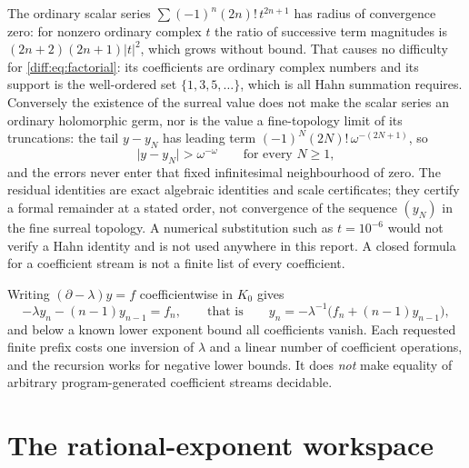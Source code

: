 \documentclass[11pt,letterpaper]{article}
\numberwithin{equation}{section}
\theoremstyle{definition}
\theoremstyle{remark}
\newcommand{\der}{\partial}
\newcommand{\abs}[1]{\lvert#1\rvert}
\begin{document}
\begin{warning}
\label{diff:warn:antitopological}
The ordinary scalar series $\sum(-1)^{n}(2n)!\,t^{2n+1}$ has radius of
convergence zero: for nonzero ordinary complex $t$ the ratio of successive
term magnitudes is $(2n+2)(2n+1)\abs t^{2}$, which grows without bound. That
causes no difficulty for \cref{diff:eq:factorial}: its coefficients are
ordinary complex numbers and its support is the well-ordered set
$\{1,3,5,\dots\}$, which is all Hahn summation requires. Conversely the
existence of the surreal value does not make the scalar series an ordinary
holomorphic germ, nor is the value a fine-topology limit of its truncations:
the tail $y-y_{N}$ has leading term
$(-1)^{N}(2N)!\,\omega^{-(2N+1)}$, so
\[
 \abs{y-y_{N}}>\omega^{-\omega}\qquad\text{for every }N\geq1 ,
\]
and the errors never enter that fixed infinitesimal neighbourhood of zero. The
residual identities are exact algebraic identities and scale certificates;
they certify a formal remainder at a stated order, not convergence of the
sequence $(y_{N})$ in the fine surreal topology. A numerical substitution such as
$t=10^{-6}$ would not verify a Hahn identity and is not used anywhere in this
report. A closed formula for a coefficient stream is not a finite list of every
coefficient.
\end{warning}

\begin{remark}
\label{diff:rem:coefrecursion}
Writing $(\der-\lambda)y=f$ coefficientwise in $K_{0}$ gives
\begin{equation}\label{diff:eq:coefrecursion}
 -\lambda y_{n}-(n-1)y_{n-1}=f_{n},
 \qquad\text{that is}\qquad
 y_{n}=-\lambda^{-1}\bigl(f_{n}+(n-1)y_{n-1}\bigr),
\end{equation}
and below a known lower exponent bound all coefficients vanish. Each requested
finite prefix costs one inversion of $\lambda$ and a linear number of
coefficient operations, and the recursion works for negative lower bounds. It
does \emph{not} make equality of arbitrary program-generated coefficient
streams decidable.
\end{remark}

\section{The rational-exponent workspace}
\label{diff:sec:rationalworkspace}
\end{document}
